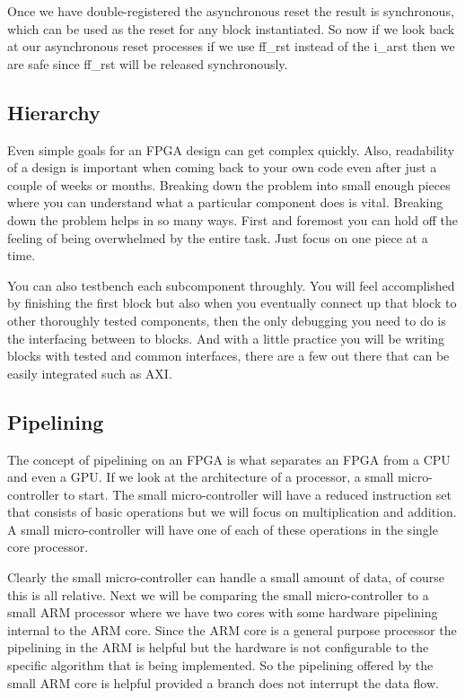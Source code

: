 Once we have double-registered the asynchronous reset the result is synchronous, which can be used as the reset for any block instantiated. So now if we look back at our asynchronous reset processes if we use ff\_rst instead of the i\_arst then we are safe since ff\_rst will be released synchronously. 
		
\subsection{Hierarchy} 

Even simple goals for an \ac{FPGA} design can get complex quickly. Also, readability of a design is important when coming back to your own code even after just a couple of weeks or months. Breaking down the problem into small enough pieces where you can understand what a particular component does is vital. Breaking down the problem helps in so many ways. First and foremost you can hold off the feeling of being overwhelmed by the entire task. Just focus on one piece at a time. 

You can also testbench each subcomponent throughly. You will feel accomplished by finishing the first block but also when you eventually connect up that block to other thoroughly tested components, then the only debugging you need to do is the interfacing between to blocks. And with a little practice you will be writing blocks with tested and common interfaces, there are a few out there that can be easily integrated such as \ac{AXI}. 
	
\subsection{Pipelining}
	
The concept of pipelining on an \ac{FPGA} is what separates an \ac{FPGA} from a \ac{CPU} and even a \ac{GPU}. If we look at the architecture of a processor, a small micro-controller to start. The small micro-controller will have a reduced instruction set that consists of basic operations but we will focus on multiplication and addition. A small micro-controller will have one of each of these operations in the single core processor.

Clearly the small micro-controller can handle a small amount of data, of course this is all relative. Next we will be comparing the small micro-controller to a small \ac{ARM} processor where we have two cores with some hardware pipelining internal to the \ac{ARM} core. Since the \ac{ARM} core is a general purpose processor the pipelining in the \ac{ARM} is helpful but the hardware is not configurable to the specific algorithm that is being implemented. So the pipelining offered by the small \ac{ARM} core is helpful provided a branch does not interrupt the data flow. 

